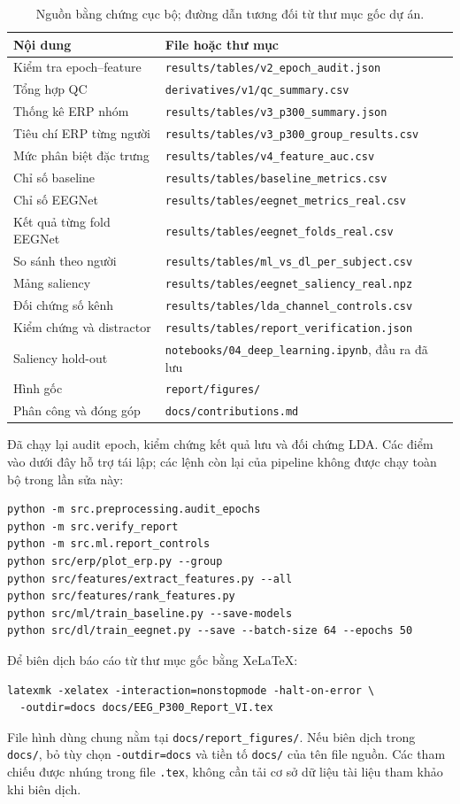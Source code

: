 \documentclass[11pt,a4paper]{article}
\newcommand{\code}[1]{\nolinkurl{#1}}
\begin{document}
\begin{table}[htbp]
\centering\footnotesize
\caption{Nguồn bằng chứng cục bộ; đường dẫn tương đối từ thư mục gốc dự án.}
\label{tab:evidence}
\begin{tabularx}{\linewidth}{lY}
\toprule
Nội dung & File hoặc thư mục\\\midrule
Kiểm tra epoch--feature & \code{results/tables/v2_epoch_audit.json}\\
Tổng hợp QC & \code{derivatives/v1/qc_summary.csv}\\
Thống kê ERP nhóm & \code{results/tables/v3_p300_summary.json}\\
Tiêu chí ERP từng người & \code{results/tables/v3_p300_group_results.csv}\\
Mức phân biệt đặc trưng & \code{results/tables/v4_feature_auc.csv}\\
Chỉ số baseline & \code{results/tables/baseline_metrics.csv}\\
Chỉ số EEGNet & \code{results/tables/eegnet_metrics_real.csv}\\
Kết quả từng fold EEGNet & \code{results/tables/eegnet_folds_real.csv}\\
So sánh theo người & \code{results/tables/ml_vs_dl_per_subject.csv}\\
Mảng saliency & \code{results/tables/eegnet_saliency_real.npz}\\
Đối chứng số kênh & \code{results/tables/lda_channel_controls.csv}\\
Kiểm chứng và distractor & \code{results/tables/report_verification.json}\\
Saliency hold-out & \code{notebooks/04_deep_learning.ipynb}, đầu ra đã lưu\\
Hình gốc & \code{report/figures/}\\
Phân công và đóng góp & \code{docs/contributions.md}\\\bottomrule
\end{tabularx}
\end{table}

Đã chạy lại audit epoch, kiểm chứng kết quả lưu và đối chứng LDA. Các điểm vào dưới đây hỗ trợ tái lập; các lệnh còn lại của pipeline không được chạy toàn bộ trong lần sửa này:
\begin{verbatim}
python -m src.preprocessing.audit_epochs
python -m src.verify_report
python -m src.ml.report_controls
python src/erp/plot_erp.py --group
python src/features/extract_features.py --all
python src/features/rank_features.py
python src/ml/train_baseline.py --save-models
python src/dl/train_eegnet.py --save --batch-size 64 --epochs 50
\end{verbatim}
Để biên dịch báo cáo từ thư mục gốc bằng XeLaTeX:
\begin{verbatim}
latexmk -xelatex -interaction=nonstopmode -halt-on-error \
  -outdir=docs docs/EEG_P300_Report_VI.tex
\end{verbatim}
File hình dùng chung nằm tại \code{docs/report_figures/}. Nếu biên dịch trong \code{docs/}, bỏ tùy chọn \code{-outdir=docs} và tiền tố \code{docs/} của tên file nguồn. Các tham chiếu được nhúng trong file \code{.tex}, không cần tải cơ sở dữ liệu tài liệu tham khảo khi biên dịch.
\FloatBarrier
\end{document}
